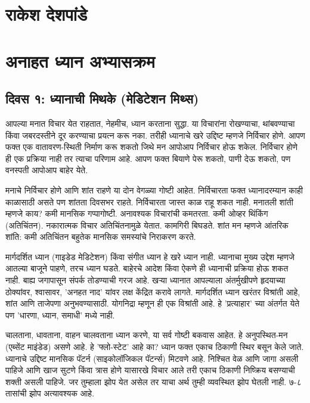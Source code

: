 \chapter*{राकेश देशपांडे }

\chapter{अनाहत  ध्यान अभ्यासक्रम}

\section*{दिवस १: ध्यानाची मिथके (मेडिटेशन मिथ्स)}

आपल्या मनात विचार येत राहतात, नेहमीच, ध्यान करताना सुद्धा. या विचारांना रोखण्याचा, थांबवण्याचा किंवा जबरदस्तीने दूर करण्याचा प्रयत्न करू नका. तरीही ध्यानाचे खरे उद्दिष्ट म्हणजे निर्विचार होणे. आपण फक्त एक वातावरण-स्थिती निर्माण करू शकतो जिथे मन आपोआप निर्विचार होऊ शकेल. निर्विचार होणे ही एक प्रक्रिया नाही तर त्याचा परिणाम आहे. आपण फक्त बियाणे पेरू शकतो, पाणी देऊ शकतो, पण वनस्पती आपोआप बाहेर येते.

मनाचे निर्विचार होणे आणि शांत राहणे या दोन वेगळ्या गोष्टी आहेत. निर्विचारता फक्त ध्यानादरम्यान काही काळासाठी असते पण शांतता दिवसभर राहते. निर्विचारता जास्त काळ राहू शकत नाही. मनातली शांती म्हणजे काय? कमी मानसिक गप्पागोष्टी. अनावश्यक विचारांची कमतरता. कमी ओव्हर थिंकिंग (अतिचिंतन). नकारात्मक विचार अतिचिंतनामुळे येतात. कामगिरी बिघडते. शांत मन म्हणजे आंतरिक शांति: कमी अतिचिंतन बहुतेक मानसिक समस्यांचे निराकरण करते.

मार्गदर्शित ध्यान (गाइडेड मेडिटेशन) किंवा संगीत ध्यान हे खरे ध्यान नाही. ध्यानाचा मुख्य उद्देश म्हणजे आतल्या बाजूने पाहणे, तरच ध्यान घडते. बाहेरचे आदेश किंवा ऐकणे ही ध्यानाची प्रक्रिया होऊ शकत नाही. बाह्य जगापासून संपर्क तोडण्याची गरज आहे. खर्‍या ध्यानात आपल्याला अंतर्मुखीपणे हृदयाच्या ठोक्यांवर, श्वासावर, 'अनहत नाद' यांवर लक्ष केंद्रित करावे लागते. मार्गदर्शित ध्यान खरंतर विश्रांती आहे, शांत आणि ताजेपणा अनुभवण्यासाठी. योगनिद्रा म्हणून ही एक विश्रांती आहे. हे 'प्रत्याहार' च्या अंतर्गत येते पण 'धारणा, ध्यान, समाधी' मध्ये नाही.

चालताना, धावताना, वाहन चालवताना ध्यान करणे, या सर्व गोष्टी बकवास आहेत. हे अनुपस्थित-मन (एब्सेंट माइंडेड) असणे आहे. हे 'फ्लो-स्टेट' आहे का? ध्यान फक्त एकाच ठिकाणी स्थिर बसून केले जाते. ध्यानाचे उद्दिष्ट मानसिक पॅटर्न (साइकोलॉजिकल पॅटर्न्स) मिटवणे आहे. निश्चित वेळ आणि जागा असली पाहिजे आणि खाज सुटणे किंवा त्रास होणे यासारखे विचार आले तरी एकाच ठिकाणी निष्क्रिय बसण्याची शक्ती असली पाहिजे. जर तुम्हाला झोप येत असेल तर याचा अर्थ तुम्ही व्यवस्थित झोप घेतली नाही. ७-८ तासांची झोप अत्यावश्यक आहे.

